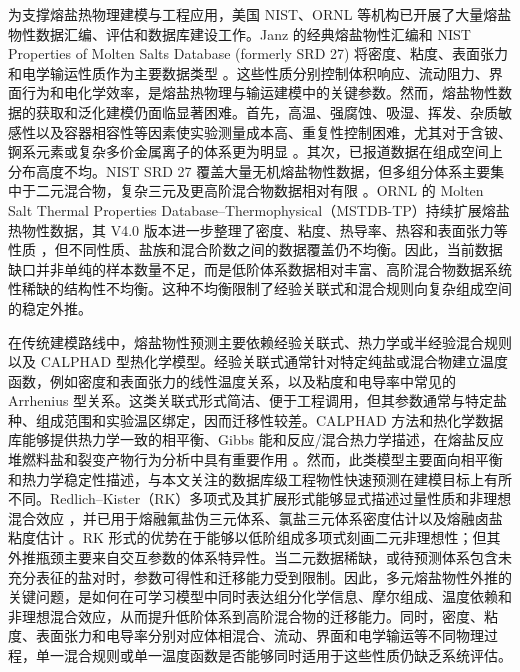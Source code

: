 \documentclass[journal=jctcce,manuscript=article,doi=true]{achemso}
\begin{document}
为支撑熔盐热物理建模与工程应用，美国 NIST、ORNL 等机构已开展了大量熔盐物性数据汇编、评估和数据库建设工作。Janz 的经典熔盐物性汇编和 NIST Properties of Molten Salts Database (formerly SRD 27) 将密度、粘度、表面张力和电学输运性质作为主要数据类型 \cite{janz1988molten,janz1992nist}。这些性质分别控制体积响应、流动阻力、界面行为和电化学效率，是熔盐热物理与输运建模中的关键参数。然而，熔盐物性数据的获取和泛化建模仍面临显著困难。首先，高温、强腐蚀、吸湿、挥发、杂质敏感性以及容器相容性等因素使实验测量成本高、重复性控制困难，尤其对于含铍、锕系元素或复杂多价金属离子的体系更为明显 \cite{roper2022molten,chesser2025mstdb,magnusson2020review}。其次，已报道数据在组成空间上分布高度不均。NIST SRD 27 覆盖大量无机熔盐物性数据，但多组分体系主要集中于二元混合物，复杂三元及更高阶混合物数据相对有限 \cite{janz1992nist}。ORNL 的 Molten Salt Thermal Properties Database--Thermophysical（MSTDB-TP）持续扩展熔盐热物性数据，其 V4.0 版本进一步整理了密度、粘度、热导率、热容和表面张力等性质 \cite{chesser2025mstdb}，但不同性质、盐族和混合阶数之间的数据覆盖仍不均衡。因此，当前数据缺口并非单纯的样本数量不足，而是低阶体系数据相对丰富、高阶混合物数据系统性稀缺的结构性不均衡。这种不均衡限制了经验关联式和混合规则向复杂组成空间的稳定外推。

在传统建模路线中，熔盐物性预测主要依赖经验关联式、热力学或半经验混合规则以及 CALPHAD 型热化学模型。经验关联式通常针对特定纯盐或混合物建立温度函数，例如密度和表面张力的线性温度关系，以及粘度和电导率中常见的 Arrhenius 型关系。这类关联式形式简洁、便于工程调用，但其参数通常与特定盐种、组成范围和实验温区绑定，因而迁移性较差。CALPHAD 方法和热化学数据库能够提供热力学一致的相平衡、Gibbs 能和反应/混合热力学描述，在熔盐反应堆燃料盐和裂变产物行为分析中具有重要作用 \cite{xiong2022fundamental,besmann2024applications}。然而，此类模型主要面向相平衡和热力学稳定性描述，与本文关注的数据库级工程物性快速预测在建模目标上有所不同。Redlich--Kister（RK）多项式及其扩展形式能够显式描述过量性质和非理想混合效应 \cite{redlich1948algebraic}，并已用于熔融氟盐伪三元体系、氯盐三元体系密度估计以及熔融卤盐粘度估计 \cite{birri2022redlich,birri2024viscosity,agca2022empirical,gallagher2022assessment}。RK 形式的优势在于能够以低阶组成多项式刻画二元非理想性；但其外推瓶颈主要来自交互参数的体系特异性。当二元数据稀缺，或待预测体系包含未充分表征的盐对时，参数可得性和迁移能力受到限制。因此，多元熔盐物性外推的关键问题，是如何在可学习模型中同时表达组分化学信息、摩尔组成、温度依赖和非理想混合效应，从而提升低阶体系到高阶混合物的迁移能力。同时，密度、粘度、表面张力和电导率分别对应体相混合、流动、界面和电学输运等不同物理过程，单一混合规则或单一温度函数是否能够同时适用于这些性质仍缺乏系统评估。
\end{document}
